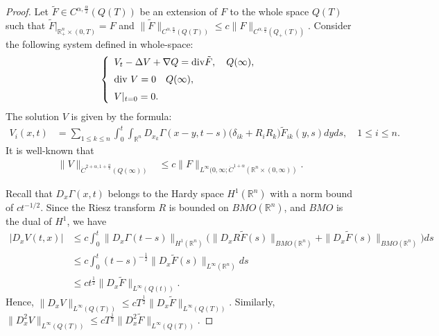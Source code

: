 \documentclass{amsart}
\numberwithin{equation}{section}
\newcommand{\R}{{ \mathbb R}^n}
\newcommand{\na}{\nabla}
\newcommand {\al}{\alpha}
\newcommand{\De}{\Delta}
\newcommand{\de}{\delta}
\newcommand{\Ga}{\Gamma}
\begin{document}
 

\begin{proof}
Let $\tilde F  \in C^{\al, \frac{\al}2} (Q ( T))$ be an extension of $F$  to the whole space $Q(T)$ such that  $ \tilde F|_{\R_+ \times (0, T)} =F$ and  $\| \tilde F\|_{C^{\al, \frac{\al}2} (Q( T))} \leq c \|  F\|_{C^{\al, \frac{\al}2} (Q_+( T))}$.
Consider the following system defined in whole-space:
\begin{align*}%
\left\{\begin{array}{l}\vspace{2mm}
 V_t - \De V+  \na Q ={\rm div } \tilde F, \quad Q( \infty),\\
\vspace{2mm}
\mbox{div } V =0 \quad Q( \infty),\\
  V|_{t =0} =0. 
\end{array}
\right.
\end{align*}
The solution $V$ is given by the formula:
\begin{align*}
V_i (x,t) &  = \sum_{1 \leq k \leq n} \int_0^t \int_{\R} D_{x_k} \Ga (x-y, t-s) \big( \de_{ik} + R_i R_k   \big) \tilde F_{ik}(y, s) dyds, \quad 1 \leq i \leq n.
\end{align*}
It is well-known that 
\begin{align*}%
\| V \|_{\dot C^{2+\al, 1+\frac{\al}2} (Q ( \infty))} &\leq c \| F\|_{L^\infty(0, \infty; \dot C^{ 1 + \al} (\R \times (0, \infty))}.
\end{align*}



Recall that  $D_x \Ga(x,t)$ belongs to the  Hardy space $H^1(\R)$ with a norm bound of $c t^{-1/2}$.   Since the Riesz transform $R$ is bounded on $BMO(\mathbb{R}^n)$, and $BMO$ is the dual of $H^1$, we have
\begin{equation}\label{251208-1}
\begin{aligned}
| D_x V(t, x)| &  \leq c \int_0^t \|D_x \Ga (t -s )\|_{H^1(\R)} \Big(  \| D_x R \tilde F (s) \|_{BMO (\R)} +  \| D_x \tilde F (s) \|_{BMO (\R)} \Big)  ds\\
& \leq c \int_0^t (t -s)^{-\frac12  }  \| D_x \tilde F (s) \|_{L^\infty (\R)} ds\\
& \leq c t^{\frac12 } \| D_x \tilde F  \|_{L^\infty (Q ( t)) }.
\end{aligned}
\end{equation}
Hence,  $
\|D_x V\|_{L^\infty (Q (  T)) } 
 \leq c  T^{\frac12 } \|D_x \tilde  F\|_{L^\infty (Q ( T))   }$. Similarly, $
\| D_x^2 V\|_{L^\infty (Q ( T))  } \leq c T^\frac12 \| D_x^2 \tilde F\|_{L^\infty (Q (  T)) }$.






\end{proof}
\end{document}
